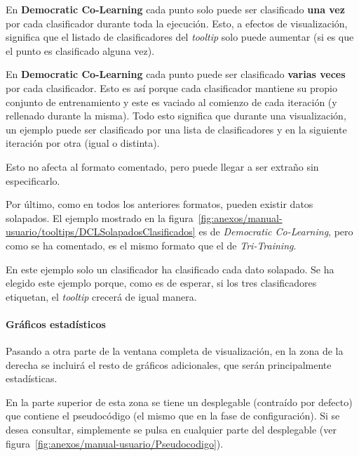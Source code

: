 En \textbf{Democratic Co-Learning} cada punto solo puede ser clasificado
\textbf{una vez} por cada clasificador durante toda la ejecución. Esto, a
efectos de visualización, significa que el listado de clasificadores del
\textit{tooltip} solo puede aumentar (si es que el punto es clasificado alguna
vez).

En \textbf{Democratic Co-Learning} cada punto puede ser clasificado
\textbf{varias veces} por cada clasificador. Esto es así porque cada
clasificador mantiene su propio conjunto de entrenamiento y este es vaciado al
comienzo de cada iteración (y rellenado durante la misma). Todo esto significa
que durante una visualización, un ejemplo puede ser clasificado por una lista de
clasificadores y en la siguiente iteración por otra (igual o distinta).

Esto no afecta al formato comentado, pero puede llegar a ser extraño sin
especificarlo.

Por último, como en todos los anteriores formatos, pueden existir datos
solapados. El ejemplo mostrado en la
figura~\ref{fig:anexos/manual-usuario/tooltips/DCLSolapadosClasificados} es de
\textit{Democratic Co-Learning}, pero como se ha comentado, es el mismo formato
que el de \textit{Tri-Training}.


En este ejemplo solo un clasificador ha clasificado cada dato solapado. Se ha
elegido este ejemplo porque, como es de esperar, si los tres clasificadores
etiquetan, el \textit{tooltip} crecerá de igual manera.

\paragraph{Gráficos estadísticos} Pasando a otra parte de la ventana completa de
visualización, en la zona de la derecha se incluirá el resto de gráficos
adicionales, que serán principalmente estadísticas.


En la parte superior de esta zona se tiene un desplegable (contraído por
defecto) que contiene el pseudocódigo (el mismo que en la fase de
configuración). Si se desea consultar, simplemente se pulsa en cualquier parte
del desplegable (ver figura~\ref{fig:anexos/manual-usuario/Pseudocodigo}).


